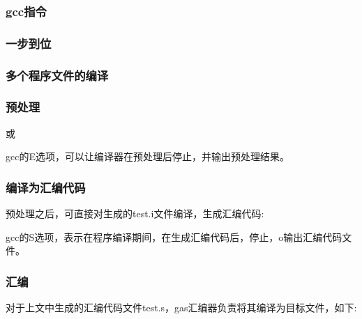 \documentclass[letterpaper,12pt,english]{sphinxmanual}
\begin{document}
\subsubsection*{gcc指令}
\subsubsection*{一步到位}

\subsubsection*{多个程序文件的编译}

\subsubsection*{预处理}

\begin{DUlineblock}{0em}
\item[] 
\item[] 或
\item[] 
\item[] gcc的\sphinxhyphen{}E选项，可以让编译器在预处理后停止，并输出预处理结果。
\end{DUlineblock}
\subsubsection*{编译为汇编代码}

\begin{DUlineblock}{0em}
\item[] 预处理之后，可直接对生成的test.i文件编译，生成汇编代码:
\item[] 
\item[] gcc的\sphinxhyphen{}S选项，表示在程序编译期间，在生成汇编代码后，停止，\sphinxhyphen{}o输出汇编代码文件。
\end{DUlineblock}
\subsubsection*{汇编}

\begin{DUlineblock}{0em}
\item[] 对于上文中生成的汇编代码文件test.s，gas汇编器负责将其编译为目标文件，如下:
\item[] 
\end{DUlineblock}
\end{document}
